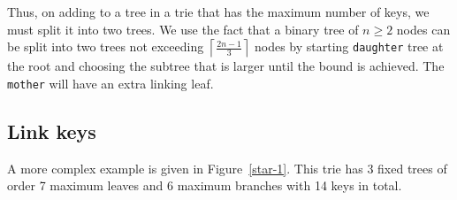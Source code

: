 \documentclass[12pt]{article}
\newcommand{\code}[1]{\colorbox{light-gray}{\texttt{#1}}}
\begin{document}
Thus, on adding to a tree in a trie that has the maximum number of keys, we must split it into two trees. We use the fact that a binary tree of $n \ge 2$ nodes can be split into two trees not exceeding $\left\lceil \frac{2n-1}{3} \right\rceil$ nodes by starting \code{daughter} tree at the root and choosing the subtree that is larger until the bound is achieved. The \code{mother} will have an extra linking leaf.

\subsection{Link keys}

A more complex example is given in Figure~\ref{star-1}. This trie has 3 fixed trees of order 7 maximum leaves and 6 maximum branches with 14 keys in total.
\end{document}

